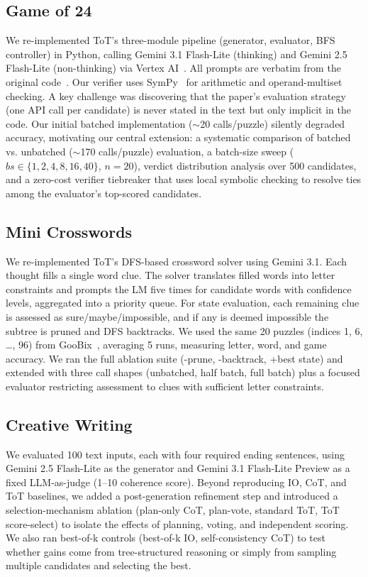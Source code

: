 \documentclass[11pt]{article}
\begin{document}
\subsection*{Game of 24}
We re-implemented ToT's three-module pipeline (generator, evaluator, BFS controller) in Python, calling Gemini 3.1 Flash-Lite (thinking) and Gemini 2.5 Flash-Lite (non-thinking) via Vertex AI~\cite{vertexai}. All prompts are verbatim from the original code~\cite{tot_code}. Our verifier uses SymPy~\cite{sympy} for arithmetic and operand-multiset checking. A key challenge was discovering that the paper's evaluation strategy (one API call per candidate) is never stated in the text but only implicit in the code. Our initial batched implementation ($\sim$20 calls/puzzle) silently degraded accuracy, motivating our central extension: a systematic comparison of batched vs. unbatched ($\sim$170 calls/puzzle) evaluation, a batch-size sweep ($bs \in \{1, 2, 4, 8, 16, 40\}$, $n = 20$), verdict distribution analysis over 500 candidates, and a zero-cost verifier tiebreaker that uses local symbolic checking to resolve ties among the evaluator's top-scored candidates.

\subsection*{Mini Crosswords}
We re-implemented ToT's DFS-based crossword solver using Gemini 3.1. Each thought fills a single word clue. The solver translates filled words into letter constraints and prompts the LM five times for candidate words with confidence levels, aggregated into a priority queue. For state evaluation, each remaining clue is assessed as sure/maybe/impossible, and if any is deemed impossible the subtree is pruned and DFS backtracks. We used the same 20 puzzles (indices 1, 6, \ldots, 96) from GooBix~\cite{puzzle_data}, averaging 5 runs, measuring letter, word, and game accuracy. We ran the full ablation suite (-prune, -backtrack, +best state) and extended with three call shapes (unbatched, half batch, full batch) plus a focused evaluator restricting assessment to clues with sufficient letter constraints.

\subsection*{Creative Writing}
We evaluated 100 text inputs, each with four required ending sentences, using Gemini 2.5 Flash-Lite as the generator and Gemini 3.1 Flash-Lite Preview as a fixed LLM-as-judge (1--10 coherence score). Beyond reproducing IO, CoT, and ToT baselines, we added a post-generation refinement step and introduced a selection-mechanism ablation (plan-only CoT, plan-vote, standard ToT, ToT score-select) to isolate the effects of planning, voting, and independent scoring. We also ran best-of-k controls (best-of-k IO, self-consistency CoT) to test whether gains come from tree-structured reasoning or simply from sampling multiple candidates and selecting the best.
\end{document}

